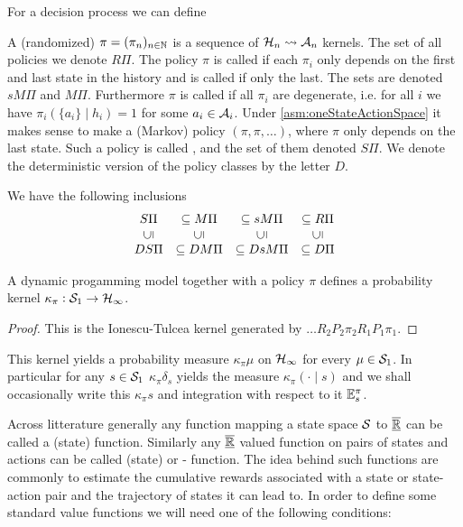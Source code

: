 For a decision process we can define
\begin{defn}[Policy]
  A (randomized)  $\pi = (\pi_n)_{n \in \mathbb{N}}$
  is a sequence of $\mathcal{H}_n \leadsto \mathcal{A}_n$ kernels.
  The set of all policies we denote $R\Pi$.
  The policy $\pi$ is called  if each $\pi_i$ only depends
  on the first and last state in the history
  and is called  if only the last.
  The sets are denoted $sM\Pi$ and $M\Pi$.
  Furthermore $\pi$ is called  if all $\pi_i$
  are degenerate, i.e. for all $i$ we have
  $\pi_i(\{a_i\} \mid h_i) = 1$ for some $a_i \in \mathcal{A}_{i}$.
  Under \cref{asm:oneStateActionSpace}
  it makes sense to make a (Markov) policy $(\pi, \pi, \dots)$,
  where $\pi$ only depends on the last state.
  Such a policy is called ,
  and the set of them denoted $S\Pi$.
  We denote the deterministic version of the policy classes
  by the letter $D$.
\end{defn}
We have the following inclusions
\[ \begin{matrix}
  S\Pi &\subseteq M\Pi &\subseteq sM\Pi &\subseteq R\Pi
  \\ \rleft{\subseteq} & \rleft{\subseteq} & \rleft{\subseteq} & \rleft{\subseteq} 
  \\ DS\Pi &\subseteq DM\Pi &\subseteq DsM\Pi &\subseteq D\Pi
\end{matrix} \] 

\begin{prop}
A dynamic progamming model together with a policy $\pi$ defines a
probability kernel $\kappa_\pi : \mathcal{S}_1 \to \mathcal{H}_\infty$.
\end{prop}
\begin{proof}
  This is the Ionescu-Tulcea kernel generated by
  $\dots R_2 P_2 \pi_2 R_1 P_1 \pi_1$.
\end{proof}
This kernel yields a probability measure $\kappa_\pi \mu$ on $\mathcal{H}_\infty$
for every $\mu \in \mathcal{S}_1$. In particular for any $s \in \mathcal{S}_1$
$\kappa_\pi \delta_s$ yields the measure $\kappa_\pi(\cdot \mid s)$
and we shall occasionally write this $\kappa_\pi s$ and
integration with respect to it $\mathbb{E}^\pi_s$.

Across litterature generally %
any function mapping a state space $\mathcal{S}$ to $\overline{\underline{\mathbb{R}}}$
can be called a (state)
 function. Similarly any $\underline{\overline{\mathbb{R}}}$ valued function
on pairs of states and actions can be called (state)
 or - function.
The idea behind such functions are commonly to estimate the
cumulative rewards associated with a state or state-action pair
and the trajectory of states it can lead to.
In order to define some standard value functions
we will need one of
the following conditions:

